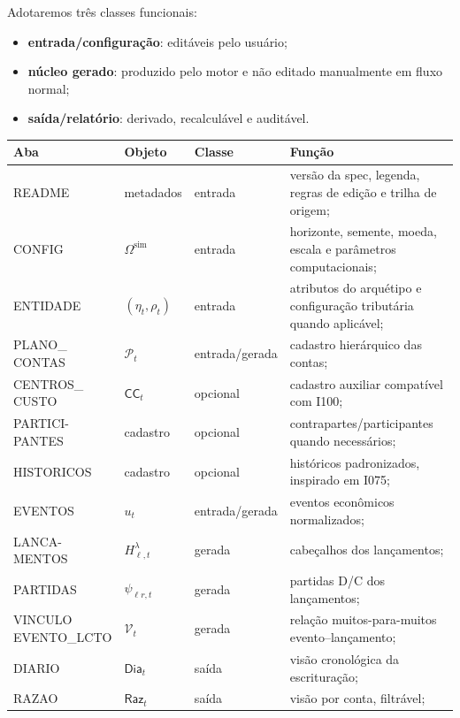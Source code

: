 \documentclass[11pt,a4paper]{article}
\newcommand{\Plano}{\mathcal{P}}
\newcommand{\Dia}{\mathsf{Dia}}
\newcommand{\Raz}{\mathsf{Raz}}
\begin{document}
Adotaremos três classes funcionais:
\begin{itemize}
    \item \textbf{entrada/configuração}: editáveis pelo usuário;
    \item \textbf{núcleo gerado}: produzido pelo motor e não editado manualmente em fluxo normal;
    \item \textbf{saída/relatório}: derivado, recalculável e auditável.
\end{itemize}

\begin{longtable}{p{} p{} p{} p{}}
\toprule
\textbf{Aba} & \textbf{Objeto} & \textbf{Classe} & \textbf{Função}\\
\midrule
README & metadados & entrada & versão da spec, legenda, regras de edição e trilha de origem;\\
CONFIG & $\Omega^{\mathrm{sim}}$ & entrada & horizonte, semente, moeda, escala e parâmetros computacionais;\\
ENTIDADE & $(\eta_t,\rho_t)$ & entrada & atributos do arquétipo e configuração tributária quando aplicável;\\
\makecell[l]{PLANO\_\\ CONTAS} & $\Plano_t$ & entrada/gerada & cadastro hierárquico das contas;\\
\makecell[l]{CENTROS\_\\ CUSTO} & $\mathsf{CC}_t$ & opcional & cadastro auxiliar compatível com I100;\\
\makecell[l]{PARTICI-\\ PANTES} & cadastro & opcional & contrapartes/participantes quando necessários;\\
HISTORICOS & cadastro & opcional & históricos padronizados, inspirado em I075;\\
EVENTOS & $u_t$ & entrada/gerada & eventos econômicos normalizados;\\
\makecell[l]{LANCA-\\ MENTOS} & $H^\lambda_{\ell,t}$ & gerada & cabeçalhos dos lançamentos;\\
PARTIDAS & $\psi_{\ell r,t}$ & gerada & partidas D/C dos lançamentos;\\
\makecell[l]{VINCULO\\ EVENTO\_LCTO} & $\mathcal V_t$ & gerada & relação muitos-para-muitos evento--lançamento;\\
DIARIO & $\Dia_t$ & saída & visão cronológica da escrituração;\\
RAZAO & $\Raz_t$ & saída & visão por conta, filtrável;\\

\end{longtable}
\end{document}
